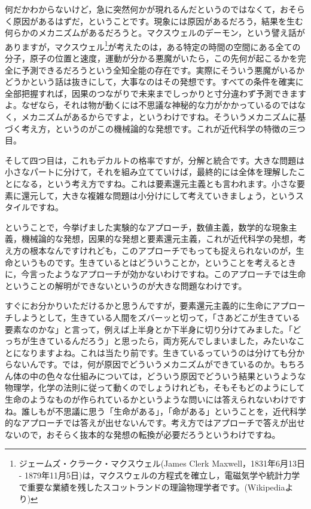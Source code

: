 \documentclass{ltjsbook}
\begin{document}
何だかわからないけど，急に突然何かが現れるんだというのではなくて，おそらく原因があるはずだ，ということです。現象には原因があるだろう，結果を生む何らかのメカニズムがあるだろうと。マクスウェルのデーモン，という譬え話がありますが，マクスウェル\footnote{ジェームズ・クラーク・マクスウェル(James Clerk Maxwell，1831年6月13日 - 1879年11月5日)は，マクスウェルの方程式を確立し，電磁気学や統計力学で重要な業績を残したスコットランドの理論物理学者です。(Wikipediaより)}が考えたのは，ある特定の時間の空間にある全ての分子，原子の位置と速度，運動が分かる悪魔がいたら，この先何が起こるかを完全に予測できるだろうという全知全能の存在です。実際にそういう悪魔がいるかどうかという話は抜きにして，大事なのはその発想です。すべての条件を確実に全部把握すれば，因果のつながりで未来までしっかりと寸分違わず予測できますよ。なぜなら，それは物が動くには不思議な神秘的な力がかかっているのではなく，メカニズムがあるからですよ，というわけですね。そういうメカニズムに基づく考え方，というのがこの機械論的な発想です。これが近代科学の特徴の三つ目。

そして四つ目は，これもデカルトの格率ですが，分解と統合です。大きな問題は小さなパートに分けて，それを組み立てていけば，最終的には全体を理解したことになる，という考え方ですね。これは要素還元主義とも言われます。小さな要素に還元して，大きな複雑な問題は小分けにして考えていきましょう，というスタイルですね。

ということで，今挙げました実験的なアプローチ，数値主義，数学的な現象主義，機械論的な発想，因果的な発想と要素還元主義，これが近代科学の発想，考え方の根本なんですけれども，このアプローチでもっても捉えられないのが，生命というものです。生きているとはどういうことか，ということを考えるときに，今言ったようなアプローチが効かないわけですね。このアプローチでは生命ということの解明ができないというのが大きな問題なわけです。

すぐにお分かりいただけるかと思うんですが，要素還元主義的に生命にアプローチしようとして，生きている人間をズバーッと切って，「さあどこが生きている要素なのかな」と言って，例えば上半身とか下半身に切り分けてみました。「どっちが生きているんだろう」と思ったら，両方死んでしまいました，みたいなことになりますよね。これは当たり前です。生きているっていうのは分けても分からないんです。では，何が原因でどういうメカニズムができているのか。もちろん体の中の色々な仕組みについては，どういう原因でどういう結果というような物理学，化学の法則に従って動くのでしょうけれども，そもそもどのようにして生命のようなものが作られているかというような問いには答えられないわけですね。誰しもが不思議に思う「生命がある」，「命がある」ということを，近代科学的なアプローチでは答えが出せないんです。考え方ではアプローチで答えが出せないので，おそらく抜本的な発想の転換が必要だろうというわけですね。
\end{document}
